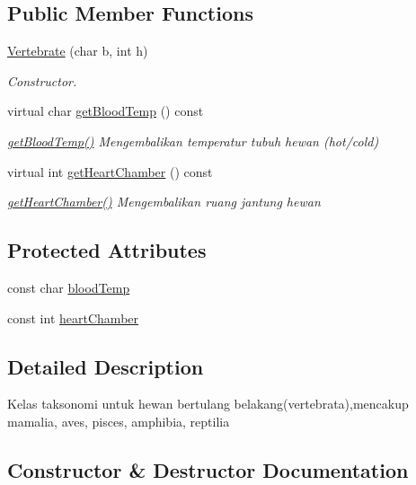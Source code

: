 \subsection*{Public Member Functions}
\begin{DoxyCompactItemize}
\item 
\hyperlink{classVertebrate_a9cf12c51fa1af575a3e039d860081785}{Vertebrate} (char b, int h)
\begin{DoxyCompactList}\small\item\em Constructor. \end{DoxyCompactList}\item 
virtual char \hyperlink{classVertebrate_a6faea9b4ef9fb50a45ec7183e401a7eb}{get\+Blood\+Temp} () const 
\begin{DoxyCompactList}\small\item\em \hyperlink{classVertebrate_a6faea9b4ef9fb50a45ec7183e401a7eb}{get\+Blood\+Temp()} Mengembalikan temperatur tubuh hewan (hot/cold) \end{DoxyCompactList}\item 
virtual int \hyperlink{classVertebrate_ab65a08899a9d2668db0b399782af2183}{get\+Heart\+Chamber} () const 
\begin{DoxyCompactList}\small\item\em \hyperlink{classVertebrate_ab65a08899a9d2668db0b399782af2183}{get\+Heart\+Chamber()} Mengembalikan ruang jantung hewan \end{DoxyCompactList}\end{DoxyCompactItemize}
\subsection*{Protected Attributes}
\begin{DoxyCompactItemize}
\item 
const char \hyperlink{classVertebrate_a342ee5c957865426029753a4d2b92f97}{blood\+Temp}
\item 
const int \hyperlink{classVertebrate_ab8d6c50292c7a75103b057fbdc782f0b}{heart\+Chamber}
\end{DoxyCompactItemize}


\subsection{Detailed Description}
Kelas taksonomi untuk hewan bertulang belakang(vertebrata),mencakup mamalia, aves, pisces, amphibia, reptilia 

\subsection{Constructor \& Destructor Documentation}
